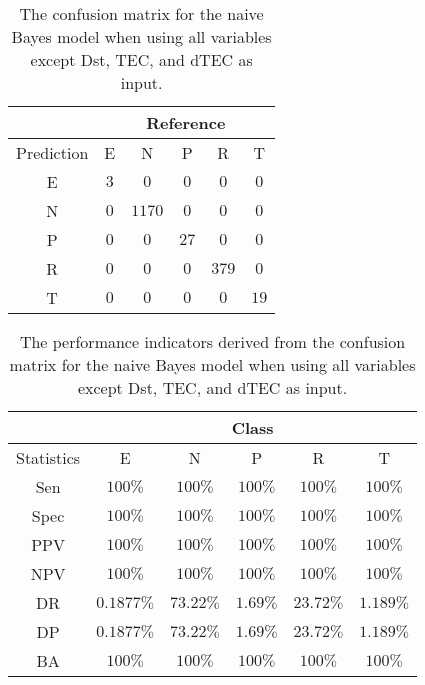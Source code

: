 \begin{table}[!ht]
	\centering
	\begin{tabular}{|c|c|c|c|c|c|}
		\hline
		 & \multicolumn{5}{|c|}{Reference} \\ \hline
		 Prediction & E & N & P & R & T \\ \hline
		 E & $3$ & $0$ & $0$ & $0$ & $0$ \\ \hline
		 N & $0$ & $1170$ & $0$ & $0$ & $0$ \\ \hline
		 P & $0$ & $0$ & $27$ & $0$ & $0$ \\ \hline
		 R & $0$ & $0$ & $0$ & $379$ & $0$ \\ \hline
		 T & $0$ & $0$ & $0$ & $0$ & $19$ \\ \hline
	\end{tabular}
	\caption{The confusion matrix for the naive Bayes model when using all variables except Dst, TEC, and dTEC as input.}
	\label{tab:cm:noTEC:nb}
\end{table}

\begin{table}[!ht]
	\centering
	\begin{tabular}{|c|c|c|c|c|c|}
		\hline
		 & \multicolumn{5}{c|}{Class} \\ \hline
		Statistics & E & N & P & R & T \\ \hline
		Sen & $100\%$ & $100\%$ & $100\%$ & $100\%$ & $100\%$ \\ \hline
		Spec & $100\%$ & $100\%$ & $100\%$ & $100\%$ & $100\%$ \\ \hline
		PPV & $100\%$ & $100\%$ & $100\%$ & $100\%$ & $100\%$ \\ \hline
		NPV & $100\%$ & $100\%$ & $100\%$ & $100\%$ & $100\%$ \\ \hline
		DR & $0.1877\%$ & $73.22\%$ & $1.69\%$ & $23.72\%$ & $1.189\%$ \\ \hline
		DP & $0.1877\%$ & $73.22\%$ & $1.69\%$ & $23.72\%$ & $1.189\%$ \\ \hline
		BA & $100\%$ & $100\%$ & $100\%$ & $100\%$ & $100\%$ \\ \hline
	\end{tabular}
	\caption{The performance indicators derived from the confusion matrix for the naive Bayes model when using all variables except Dst, TEC, and dTEC as input.}
	\label{tab:cs:reverse:noTEC:nb}
\end{table}


